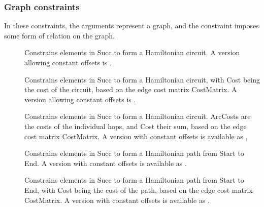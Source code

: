 \subsubsection{Graph constraints}

In these constraints, the arguments represent a graph, and the
 constraint imposes some form of relation on the graph.

\begin{description}
\item[]
Constrains elements in Succ to form a Hamiltonian circuit.
A version allowing constant offsets is
.

\item[]
Constrains elements in Succ to form a Hamiltonian circuit, with Cost
being the cost of the circuit, based on the edge cost matrix CostMatrix.
A version allowing constant offsets is
.

\item[]
Constrains elements in Succ to form a Hamiltonian circuit. ArcCosts
are the costs of the individual hops, and Cost their sum,
based on the edge cost matrix CostMatrix.
A version with constant offsets is available as
,

\item[]
Constrains elements in Succ to form a Hamiltonian path from Start to End.
A version with constant offsets is available as
.

\item[]
Constrains elements in Succ to form a Hamiltonian path from Start to End,
with Cost being the cost of the path, based on the edge cost matrix CostMatrix.
A version with constant offsets is available as
.


\end{description}
